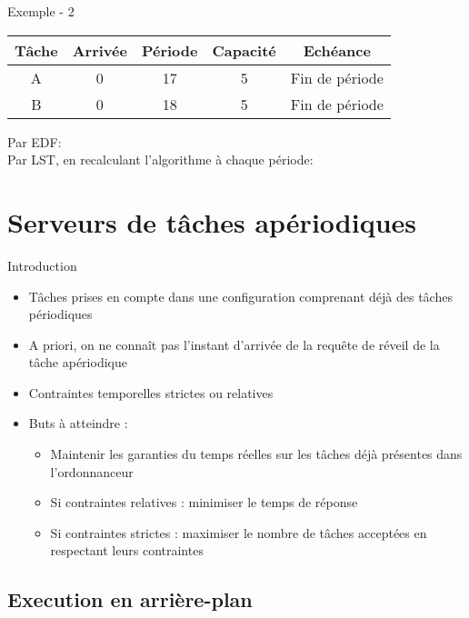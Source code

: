 \begin{frame}{Exemple - 2}
  \begin{center}
    \begin{tabular}{ccccc}
      \hline
      Tâche & Arrivée & Période & Capacité & Echéance \\
      \hline
      A & 0 & 17 & 5 & Fin de période\\
      B & 0 & 18 & 5 & Fin de période\\
      \hline
    \end{tabular}
  \end{center}
  Par EDF:\\
  

  Par LST, en recalculant l'algorithme à chaque période:\\
  
\end{frame} 

\section{Serveurs de tâches apériodiques}


\begin{frame}{Introduction} 
  \begin{itemize}
  \item Tâches prises en compte dans une configuration comprenant déjà
    des tâches périodiques
  \item A priori, on ne  connaît pas l'instant d'arrivée de la requête
    de réveil de la tâche apériodique
  \item Contraintes temporelles strictes ou relatives 
  \item Buts à atteindre : 
    \begin{itemize}
    \item Maintenir les garanties du temps réelles sur les tâches déjà
      présentes dans l'ordonnanceur
    \item Si contraintes relatives : minimiser le temps de réponse
    \item  Si contraintes  strictes :  maximiser le  nombre  de tâches
      acceptées en respectant leurs contraintes
    \end{itemize}
  \end{itemize}
\end{frame}

\subsection{Execution en arrière-plan}

